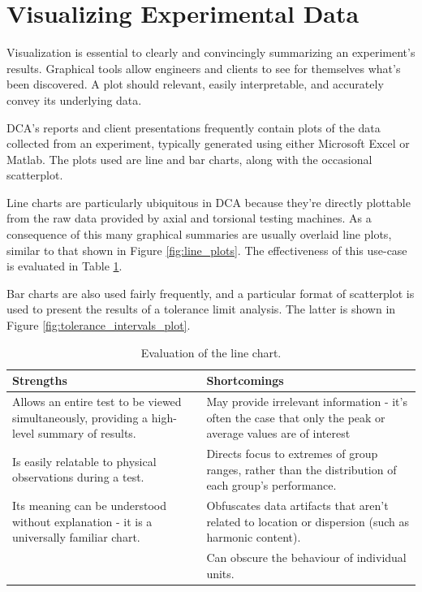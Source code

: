\documentclass[11pt,a4paper,article]{memoir} %
\begin{document}
\section{Visualizing Experimental Data}
Visualization is essential to clearly and convincingly summarizing an experiment's results. Graphical tools allow engineers and clients to see for themselves what's been discovered. A plot should relevant, easily interpretable, and accurately convey its underlying data.
\par
DCA's reports and client presentations frequently contain plots of the data collected from an experiment, typically generated using either Microsoft Excel or Matlab. The plots used are line and bar charts, along with the occasional scatterplot.
\par
Line charts are particularly ubiquitous in DCA because they're directly plottable from the raw data provided by axial and torsional testing machines. As a consequence of this many graphical summaries are usually overlaid line plots, similar to that shown in Figure \ref{fig:line_plots}. The effectiveness of this use-case is evaluated in Table \ref{tab:line_chart}.
\par
Bar charts are also used fairly frequently, and a particular format of scatterplot is used to present the results of a tolerance limit analysis. The latter is shown in Figure \ref{fig:tolerance_intervals_plot}.
 
\begin{table}[b]
\caption{Evaluation of the line chart.}
\small
\hspace*{-.5cm}
\begin{tabular}{p{6.5cm}p{6.5cm}}
\toprule
\textbf{Strengths}	&	\textbf{Shortcomings} \\
\toprule
Allows an entire test to be viewed simultaneously, providing a high-level summary of results.	&	May provide irrelevant information - it's often the case that only the peak or average values are of interest	\\
Is easily relatable to physical observations during a test.	&	Directs focus to extremes of group ranges, rather than the distribution of each group's performance.	\\
Its meaning can be understood without explanation - it is a universally familiar chart.	&  Obfuscates data artifacts that aren't related to location or dispersion (such as harmonic content). \\
&  Can obscure the behaviour of individual units. 			\\
\bottomrule
\end{tabular}
\label{tab:line_chart}
\end{table}
\end{document}
